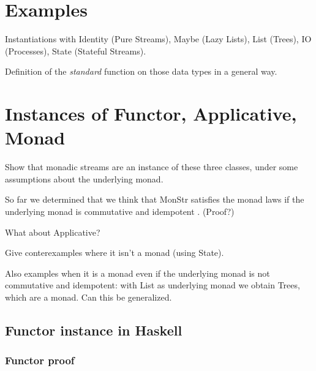 \documentclass{article}
\begin{document}
\section{Examples}

Instantiations with Identity (Pure Streams), Maybe (Lazy Lists), List (Trees), IO (Processes), State (Stateful Streams).

Definition of the {\em standard} function on those data types in a general way.

\section{Instances of Functor, Applicative, Monad}

Show that monadic streams are an instance of these three classes, under some assumptions about the underlying monad.

So far we determined that we think that MonStr satisfies the monad laws if the underlying monad is commutative and idempotent \cite{idempotent_monads}. (Proof?)

What about Applicative?

Give conterexamples where it isn't a monad (using State).

Also examples when it is a monad even if the underlying monad is not commutative and idempotent: with List as underlying monad we obtain Trees, which are a monad. Can this be generalized.

\subsection{Functor instance in Haskell}


\subsubsection{Functor proof}
\end{document}
